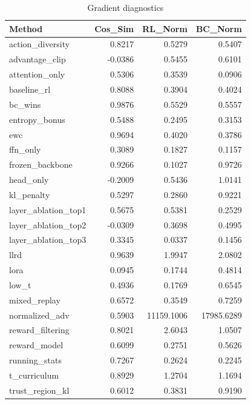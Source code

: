 \begin{table}[htbp]
\centering
\caption{Gradient diagnostics}
\label{tab:grad-diag}
\begin{tabular}{lrrr}
\toprule
\textbf{Method} & \textbf{Cos\_Sim} & \textbf{RL\_Norm} & \textbf{BC\_Norm} \\
\midrule
action\_diversity & 0.8217 & 0.5279 & 0.5407 \\
advantage\_clip & -0.0386 & 0.5455 & 0.6101 \\
attention\_only & 0.5306 & 0.3539 & 0.0906 \\
baseline\_rl & 0.8088 & 0.3904 & 0.4024 \\
bc\_wins & 0.9876 & 0.5529 & 0.5557 \\
entropy\_bonus & 0.5488 & 0.2495 & 0.3153 \\
ewc & 0.9694 & 0.4020 & 0.3786 \\
ffn\_only & 0.3089 & 0.1827 & 0.1157 \\
frozen\_backbone & 0.9266 & 0.1027 & 0.9726 \\
head\_only & -0.2009 & 0.5436 & 1.0141 \\
kl\_penalty & 0.5297 & 0.2860 & 0.9221 \\
layer\_ablation\_top1 & 0.5675 & 0.5381 & 0.2529 \\
layer\_ablation\_top2 & -0.0309 & 0.3698 & 0.4995 \\
layer\_ablation\_top3 & 0.3345 & 0.0337 & 0.1456 \\
llrd & 0.9639 & 1.9947 & 2.0802 \\
lora & 0.0945 & 0.1744 & 0.4814 \\
low\_t & 0.4936 & 0.1769 & 0.6545 \\
mixed\_replay & 0.6572 & 0.3549 & 0.7259 \\
normalized\_adv & 0.5903 & 11159.1006 & 17985.6289 \\
reward\_filtering & 0.8021 & 2.6043 & 1.0507 \\
reward\_model & 0.6099 & 0.2751 & 0.5626 \\
running\_stats & 0.7267 & 0.2624 & 0.2245 \\
t\_curriculum & 0.8929 & 1.2704 & 1.1694 \\
trust\_region\_kl & 0.6012 & 0.3831 & 0.9190 \\
\bottomrule
\end{tabular}
\end{table}